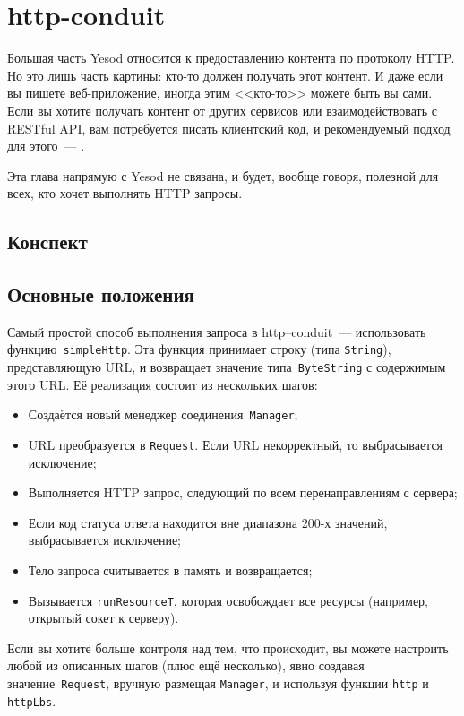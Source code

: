 \chapter{http-conduit}
Большая часть Yesod относится к предоставлению контента по протоколу
HTTP. Но это лишь часть картины: кто-то должен получать этот контент. И даже
если вы пишете веб-приложение, иногда этим <<кто-то>> можете быть вы
сами. Если вы хотите получать контент от других сервисов или
взаимодействовать с RESTful API, вам потребуется писать
клиентский код, и рекомендуемый подход для этого~---
.

Эта глава напрямую с Yesod не связана, и будет, вообще говоря, полезной для
всех, кто хочет выполнять HTTP запросы.

\section{Конспект}


\section{Основные положения}
Самый простой способ выполнения запроса в http--conduit~--- использовать
функцию~\lstinline!simpleHttp!. Эта функция принимает строку
(типа \lstinline!String!), представляющую URL, и возвращает
значение типа~\lstinline!ByteString! с содержимым этого URL. Её реализация
состоит из нескольких шагов:
\begin{itemize}
\item Создаётся новый менеджер соединения~\lstinline!Manager!;
\item URL преобразуется в \lstinline!Request!. Если URL некорректный,
  то выбрасывается исключение;
\item Выполняется HTTP запрос, следующий по всем перенаправлениям с сервера;
\item Если код статуса ответа находится вне диапазона 200-х значений,
  выбрасывается исключение;
\item Тело запроса считывается в память и возвращается;
\item Вызывается \lstinline!runResourceT!, которая освобождает все
  ресурсы (например, открытый сокет к серверу).
\end{itemize}

Если вы хотите больше контроля над тем, что происходит, вы можете
настроить любой из описанных шагов (плюс ещё несколько), явно создавая
значение~\lstinline!Request!, вручную размещая \lstinline!Manager!, и
используя функции \lstinline!http! и \lstinline!httpLbs!.

